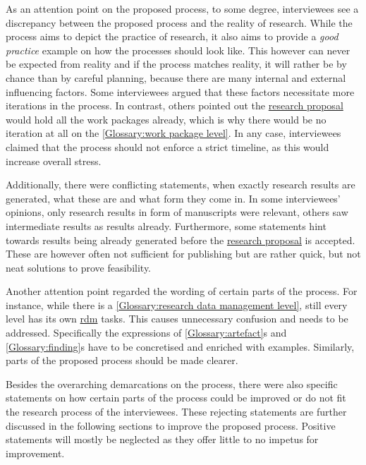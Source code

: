 \documentclass{bausteinefdm}
\begin{document}
As an attention point on the proposed process, to some degree, interviewees see a discrepancy between the proposed process and the reality of research.
While the process aims to depict the practice of research, it also aims to provide a \textit{good practice} example on how the processes should look like.
This however can never be expected from reality and if the process matches reality, it will rather be by chance than by careful planning, because there are many internal and external influencing factors.
Some interviewees argued that these factors necessitate more iterations in the process.
In contrast, others pointed out the \hyperref[Glossary:research proposal]{research proposal} would hold all the work packages already, which is why there would be no iteration at all on the \ref{Glossary:work package level}.
In any case, interviewees claimed that the process should not enforce a strict timeline, as this would increase overall stress.

Additionally, there were conflicting statements, when exactly research results are generated, what these are and what form they come in.
In some interviewees' opinions, only research results in form of manuscripts were relevant, others saw intermediate results as results already.
Furthermore, some statements hint towards results being already generated before the \hyperref[Glossary:research proposal]{research proposal} is accepted.
These are however often not sufficient for publishing but are rather quick, but not neat solutions to prove feasibility.

Another attention point regarded the wording of certain parts of the process.
For instance, while there is a \ref{Glossary:research data management level}, still every level has its own \hyperref[Glossary:research data management level]{\ac{rdm}} tasks.
This causes unnecessary confusion and needs to be addressed.
Specifically the expressions of \ref{Glossary:artefact}s and \ref{Glossary:finding}s have to be concretised and enriched with examples.
Similarly, parts of the proposed process should be made clearer.




Besides the overarching demarcations on the process, there were also specific statements on how certain parts of the process could be improved or do not fit the research process of the interviewees.
These rejecting statements are further discussed in the following sections to improve the proposed process.
Positive statements will mostly be neglected as they offer little to no impetus for improvement.
\end{document}
